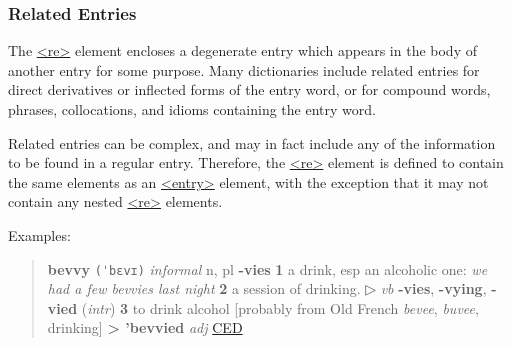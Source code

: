 \subsubsection[{Related Entries}]{Related Entries}\label{DITPRE}\par
The \hyperref[TEI.re]{<re>} element encloses a degenerate entry which appears in the body of another entry for some purpose. Many dictionaries include related entries for direct derivatives or inflected forms of the entry word, or for compound words, phrases, collocations, and idioms containing the entry word.\par
Related entries can be complex, and may in fact include any of the information to be found in a regular entry. Therefore, the \hyperref[TEI.re]{<re>} element is defined to contain the same elements as an \hyperref[TEI.entry]{<entry>} element, with the exception that it may not contain any nested \hyperref[TEI.re]{<re>} elements.\par
Examples:
\begin{quote}{\bfseries bevvy} \texttt{(ˈbɛvɪ)} \textit{informal} n, pl {\bfseries -vies} {\bfseries 1} a drink, esp an alcoholic one: {\itshape we had a few bevvies last night} {\bfseries 2} a session of drinking. ▷ {\itshape vb} {\bfseries -vies}, {\bfseries -vying}, {\bfseries -vied} ({\itshape intr}) {\bfseries 3} to drink alcohol [probably from Old French {\itshape bevee}, {\itshape buvee}, drinking] {\bfseries > 'bevvied} {\itshape adj} \hyperref[DIC-CED]{CED}\end{quote}

